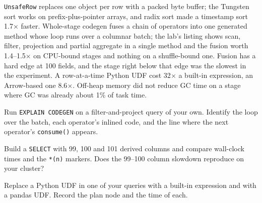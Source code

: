 \texttt{UnsafeRow} replaces one object per row with a packed byte buffer; the
Tungsten sort works on prefix-plus-pointer arrays, and radix sort made a timestamp
sort 1.7$\times$ faster. Whole-stage codegen fuses a chain of operators into one
generated method whose loop runs over a columnar batch; the lab's listing shows
scan, filter, projection and partial aggregate in a single method and the fusion
worth 1.4--1.5$\times$ on CPU-bound stages and nothing on a shuffle-bound one.
Fusion has a hard edge at 100 fields, and the stage right below that edge was the
slowest in the experiment. A row-at-a-time Python UDF cost 32$\times$ a built-in
expression, an Arrow-based one 8.6$\times$. Off-heap memory did not reduce GC time
on a stage where GC was already about 1\% of task time.

\exercisehead
\begin{exercises}
\item Run \texttt{EXPLAIN CODEGEN} on a filter-and-project query of your own.
      Identify the loop over the batch, each operator's inlined code, and the line
      where the next operator's \texttt{consume()} appears.
\item Build a \texttt{SELECT} with 99, 100 and 101 derived columns and compare
      wall-clock times and the \texttt{*(n)} markers. Does the 99--100 column
      slowdown reproduce on your cluster?
\item Replace a Python UDF in one of your queries with a built-in expression and
      with a pandas UDF. Record the plan node and the time of each.
\end{exercises}
